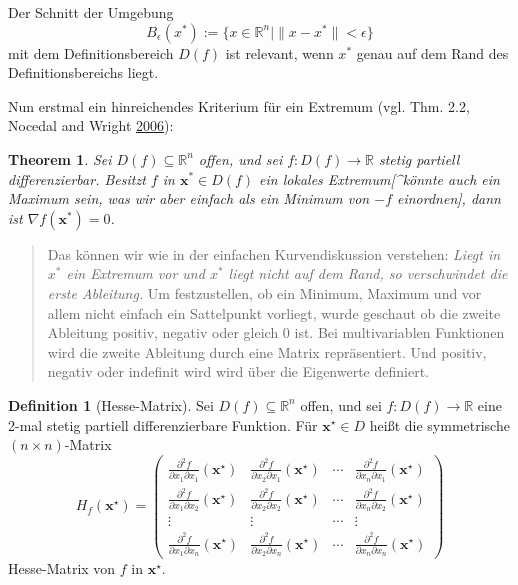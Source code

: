 \documentclass[]{book}
\newenvironment {JHSAYS} [0] {\begin{quote}\color{jhsc}} {\end{quote}}
\newtheorem{theorem}{Theorem}[chapter]
\theoremstyle{definition}
\newtheorem{definition}{Definition}[chapter]
\theoremstyle{definition}
\theoremstyle{definition}
\theoremstyle{definition}
\theoremstyle{remark}
\begin{document}
Der Schnitt der Umgebung
\[ B_\epsilon(x^*) := \{x\in \mathbb R^{n}| \|x-x^*\|< \epsilon\} \]
mit dem Definitionsbereich \(D(f)\) ist relevant, wenn \(x^*\) genau auf dem Rand des Definitionsbereichs liegt.

Nun erstmal ein hinreichendes Kriterium für ein Extremum
(vgl. Thm. 2.2, Nocedal and Wright \protect\hyperlink{ref-NocW06}{2006}):

\begin{theorem}
Sei \(D(f) \subseteq \mathbb{R}^{n}\) offen, und sei \(f\colon D(f) \rightarrow \mathbb{R}\) stetig partiell differenzierbar. Besitzt \(f\) in \(\mathbf{x}^{*} \in D(f)\) ein lokales Extremum{[}\^{}könnte auch ein Maximum sein, was wir aber einfach als ein Minimum von \(-f\) einordnen{]}, dann ist \(\nabla f(\mathbf{x}^{*})=0\).
\end{theorem}

\begin{JHSAYS}
Das können wir wie in der einfachen Kurvendiskussion verstehen: \emph{Liegt in \(x^*\) ein Extremum vor und \(x^*\) liegt nicht auf dem Rand, so verschwindet die erste Ableitung.} Um festzustellen, ob ein Minimum, Maximum und vor allem nicht einfach ein Sattelpunkt vorliegt, wurde geschaut ob die zweite Ableitung positiv, negativ oder gleich 0 ist. Bei multivariablen Funktionen wird die zweite Ableitung durch eine Matrix repräsentiert. Und positiv, negativ oder indefinit wird wird über die Eigenwerte definiert.

\end{JHSAYS}

\begin{definition}[Hesse-Matrix]
Sei \(D(f) \subseteq \mathbb{R}^{n}\) offen, und sei \(f\colon D(f) \rightarrow \mathbb{R}\) eine 2-mal stetig partiell differenzierbare Funktion. Für \(\mathbf{x}^{\star} \in D\) heißt die symmetrische \((n \times n)\)-Matrix
\[
H_{f}\left(\mathbf{x}^{\star}\right)=\left(\begin{array}{cccc}
\frac{\partial^{2} f}{\partial x_{1} \partial x_{1}}\left(\mathbf{x}^{\star}\right) & \frac{\partial^{2} f}{\partial x_{2} \partial x_{1}}\left(\mathbf{x}^{\star}\right) & \cdots & \frac{\partial^{2} f}{\partial x_{n} \partial x_{1}}\left(\mathbf{x}^{\star}\right) \\
\frac{\partial^{2} f}{\partial x_{1} \partial x_{2}}\left(\mathbf{x}^{\star}\right) & \frac{\partial^{2} f}{\partial x_{2} \partial x_{2}}\left(\mathbf{x}^{\star}\right) & \cdots & \frac{\partial^{2} f}{\partial x_{n} \partial x_{2}}\left(\mathbf{x}^{\star}\right) \\
\vdots & \vdots & \cdots & \vdots \\
\frac{\partial^{2} f}{\partial x_{1} \partial x_{n}}\left(\mathbf{x}^{\star}\right) & \frac{\partial^{2} f}{\partial x_{2} \partial x_{n}}\left(\mathbf{x}^{\star}\right) & \cdots & \frac{\partial^{2} f}{\partial x_{n} \partial x_{n}}\left(\mathbf{x}^{\star}\right)
\end{array}\right)
\]
Hesse-Matrix von \(f\) in \(\mathbf{x}^{\star}\).
\end{definition}
\end{document}
